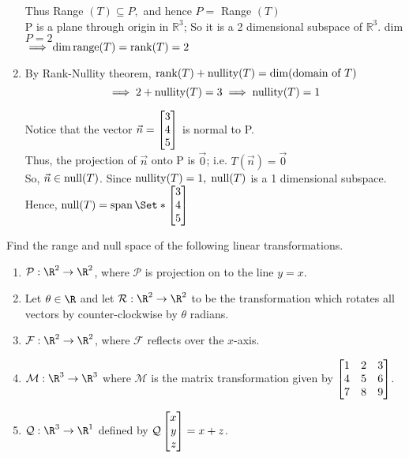 \begin{exercises}
\begin{problist}
\begin{solution}
\begin{enumerate}
                Thus Range \((T) \subseteq P,\) and hence \(P=\) Range \((T)\)\\
                
                P is a plane through origin in \(\mathbb{R}^{3}\); So it is a 2 dimensional
                subspace of \(\mathbb{R}^{3}\). dim \(P=2\)\\
                
                $\implies \operatorname{dim} \operatorname{range}(T) = \operatorname{rank}(T)=2$
                
                \item By Rank-Nullity theorem, $\operatorname{rank}(T)+\operatorname{nullity}(T) = \operatorname{dim}(\text{domain of } T)$\\
                \[\implies 2+\operatorname{nullity}(T)=3 \implies \operatorname{nullity}(T)=1\]
                
                Notice that the vector $\vec n = \mat{3\\4\\5}$ is normal to P.\\
                
                Thus, the projection of $\vec n$ onto P is $\vec 0$; i.e. $T(\vec n) =\vec 0$\\
                
                So, $\vec n\in \operatorname{null}(T)$. Since $\operatorname{nullity}(T)=1, \;\operatorname{null}(T)$ is a 1 dimensional subspace.\\
                
                Hence, $\Null(T) = \Span\Set*{\mat{3\\4\\5}}$
            \end{enumerate}
        \end{solution}

		\prob Find the range and null space of the following linear
		transformations.
		\begin{enumerate}
			\item $\mathcal P:\R^{2}\to\R^{2}$, where
				$\mathcal P$ is projection on to the line
				$y=x$.

			\item Let $\theta\in \R$ and let $\mathcal R:\R^{2}\to\R^{2}$
				to be the transformation which rotates all vectors
				by counter-clockwise by $\theta$ radians.

			\item $\mathcal F:\R^{2}\to\R^{2}$, where
				$\mathcal F$ reflects over the $x$-axis.

			\item $\mathcal M:\R^3\to\R^3$ where $\mathcal M$ is the matrix
				transformation given by $\mat{1&2&3\\4&5&6\\7&8&9}$.
			\item $\mathcal Q:\R^3\to\R^1$ defined by $\mathcal Q\mat{x\\y\\z}=x+z$.
		\end{enumerate}


\end{problist}
\end{exercises}
